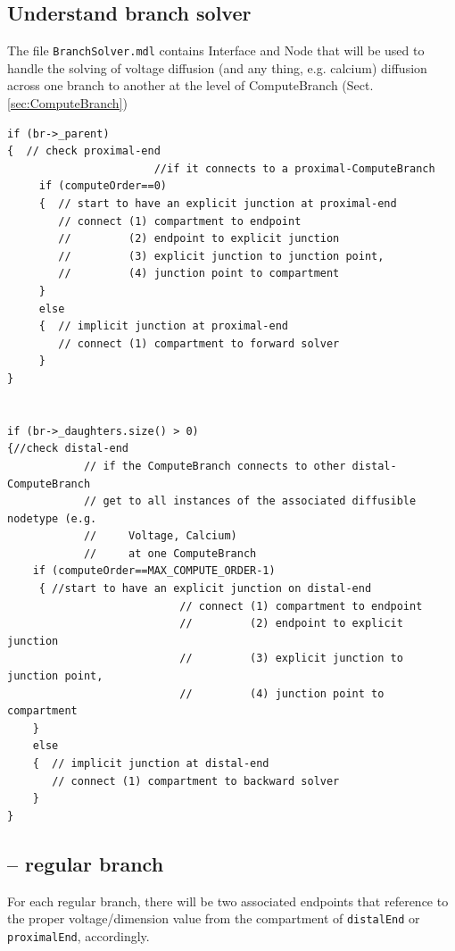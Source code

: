\subsection{Understand branch solver}

The file \verb!BranchSolver.mdl! contains Interface and Node that will be used
to handle the solving of voltage diffusion (and any thing, e.g. calcium)
diffusion across one branch to another at the level of ComputeBranch
(Sect.\ref{sec:ComputeBranch})

\begin{verbatim}
if (br->_parent)
{  // check proximal-end
					   //if	it connects to a proximal-ComputeBranch
     if (computeOrder==0) 
     {  // start to have an explicit junction at proximal-end 
        // connect (1) compartment to endpoint 
		//         (2) endpoint to explicit junction
		//         (3) explicit junction to junction point,
		//         (4) junction point to compartment 
     }
     else
     {  // implicit junction at proximal-end
		// connect (1) compartment to forward solver 
     }
}


if (br->_daughters.size() > 0)
{//check distal-end 
			// if the ComputeBranch connects to other distal-ComputeBranch
            // get to all instances of the associated diffusible nodetype (e.g.
            //     Voltage, Calcium)
            //     at one ComputeBranch
    if (computeOrder==MAX_COMPUTE_ORDER-1)
     { //start to have an explicit junction on distal-end
						   // connect (1) compartment to endpoint 
						   //         (2) endpoint to explicit junction
						   //         (3) explicit junction to junction point,
						   //         (4) junction point to compartment 
    }
    else
    {  // implicit junction at distal-end
	   // connect (1) compartment to backward solver 
    }
}
\end{verbatim}

\subsection{-- regular branch}
\label{sec:regular-branch-neuron}

For each regular branch, there will be two associated endpoints that reference
to the proper voltage/dimension value from the compartment of \verb!distalEnd!
or \verb!proximalEnd!, accordingly.

